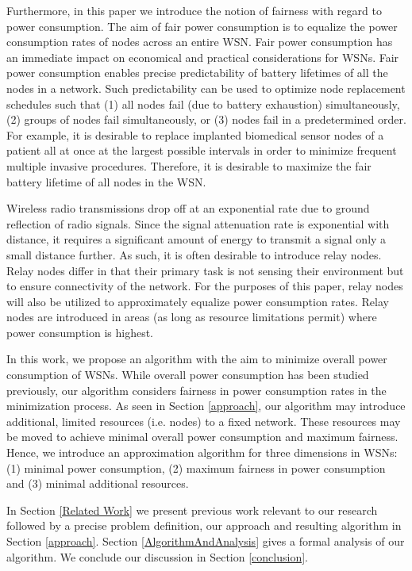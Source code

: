 Furthermore, in this paper we introduce the notion of fairness with regard to power consumption. The aim of fair power consumption is to equalize the power consumption rates of nodes across an entire WSN. Fair power consumption has an immediate impact on economical and practical considerations for WSNs. Fair power consumption enables precise predictability of battery lifetimes of all the nodes in a network. Such predictability can be used to optimize node replacement schedules such that (1) all nodes fail (due to battery exhaustion) simultaneously, (2) groups of nodes fail simultaneously, or (3) nodes fail in a predetermined order. For example, it is desirable to replace implanted biomedical sensor nodes of a patient all at once at the largest possible intervals in order to minimize frequent multiple invasive procedures. Therefore, it is desirable to maximize the fair battery lifetime of all nodes in the WSN.

Wireless radio transmissions drop off at an exponential rate due to ground reflection of radio signals. Since the signal attenuation rate is exponential with distance, it requires a significant amount of energy to transmit a signal only a small distance further. As such, it is often desirable to introduce relay nodes. Relay nodes differ in that their primary task is not sensing their environment but to ensure connectivity of the network. For the purposes of this paper, relay nodes will also be utilized to approximately equalize power consumption rates. Relay nodes are introduced in areas (as long as resource limitations permit) where power consumption is highest.

In this work, we propose an algorithm with the aim to minimize overall power consumption of WSNs. While overall power consumption has been studied previously, our algorithm considers fairness in power consumption rates in the minimization process. As seen in Section \ref{approach}, our algorithm may introduce additional, limited resources (i.e. nodes) to a fixed network. These resources may be moved to achieve minimal overall power consumption and maximum fairness. Hence, we introduce an approximation algorithm for three dimensions in WSNs: (1) minimal power consumption, (2) maximum fairness in power consumption and (3) minimal additional resources.

In Section \ref{Related Work} we present previous work relevant to our research followed by a precise problem definition, our approach and resulting algorithm in Section \ref{approach}. Section \ref{AlgorithmAndAnalysis} gives a formal analysis of our algorithm. We conclude our discussion in Section \ref{conclusion}.

